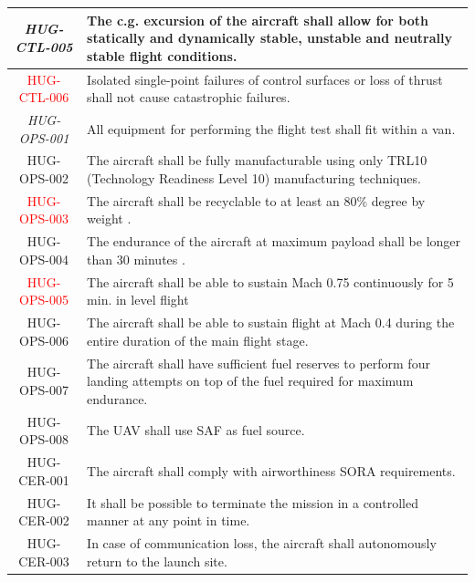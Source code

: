 \begin{longtable}{|c|p{13cm}|}
\textit{HUG-CTL-005} & The c.g. excursion of the aircraft shall allow for both statically and dynamically stable, unstable and neutrally stable flight conditions. \\ \hline

\textcolor{red}{HUG-CTL-006}&  Isolated single-point failures of control surfaces or loss of thrust shall not cause catastrophic failures. \\ \hline

\textit{HUG-OPS-001} & All equipment for performing the flight test shall fit within a van. 
\\ \hline
HUG-OPS-002 & The aircraft shall be fully manufacturable using only TRL10 (Technology Readiness Level 10) manufacturing techniques.\\ \hline

\textcolor{red}{HUG-OPS-003} & The aircraft shall be recyclable to at least an 80\% degree by weight \cite{peregrine2021}. \\ \hline

HUG-OPS-004 & The endurance of the aircraft at maximum payload shall be longer than 30 minutes \cite{Castro2026}. \\ \hline

\textcolor{red}{HUG-OPS-005} & The aircraft shall be able to sustain Mach 0.75 continuously for 5 min. in level flight \\ \hline

HUG-OPS-006 & The aircraft shall be able to sustain flight at Mach 0.4 during the entire duration of the main flight stage. \\ \hline

HUG-OPS-007 & The aircraft shall have sufficient fuel reserves to perform four landing attempts on top of the fuel required for maximum endurance.  \\ \hline

HUG-OPS-008 & The UAV shall use SAF as fuel source.\\
\hline

HUG-CER-001 & The aircraft shall comply with airworthiness SORA requirements.\\ \hline

HUG-CER-002 & It shall be possible to terminate the mission in a controlled manner at any point in time. \\ \hline

HUG-CER-003 & In case of communication loss, the aircraft shall autonomously return to the launch site. \\ \hline


\end{longtable}

